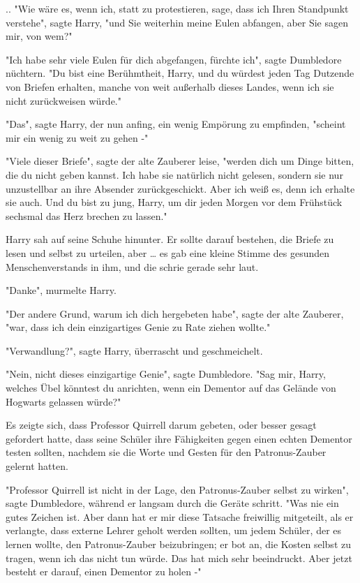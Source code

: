 {.. "Wie wäre es, wenn ich, statt zu protestieren, sage, dass ich Ihren Standpunkt verstehe", sagte Harry, "und Sie weiterhin meine Eulen abfangen, aber Sie sagen mir, von wem?"

"Ich habe sehr viele Eulen für dich abgefangen, fürchte ich", sagte Dumbledore nüchtern. "Du bist eine Berühmtheit, Harry, und du würdest jeden Tag Dutzende von Briefen erhalten, manche von weit außerhalb dieses Landes, wenn ich sie nicht zurückweisen würde."

"Das", sagte Harry, der nun anfing, ein wenig Empörung zu empfinden, "scheint mir ein wenig zu weit zu gehen -"

"Viele dieser Briefe", sagte der alte Zauberer leise, "werden dich um Dinge bitten, die du nicht geben kannst. Ich habe sie natürlich nicht gelesen, sondern sie nur unzustellbar an ihre Absender zurückgeschickt. Aber ich weiß es, denn ich erhalte sie auch. Und du bist zu jung, Harry, um dir jeden Morgen vor dem Frühstück sechsmal das Herz brechen zu lassen."

Harry sah auf seine Schuhe hinunter. Er sollte darauf bestehen, die Briefe zu lesen und selbst zu urteilen, aber … es gab eine kleine Stimme des gesunden Menschenverstands in ihm, und die schrie gerade sehr laut.

"Danke", murmelte Harry.

"Der andere Grund, warum ich dich hergebeten habe", sagte der alte Zauberer, "war, dass ich dein einzigartiges Genie zu Rate ziehen wollte."

"Verwandlung?", sagte Harry, überrascht und geschmeichelt.

"Nein, nicht dieses einzigartige Genie", sagte Dumbledore. "Sag mir, Harry, welches Übel könntest du anrichten, wenn ein Dementor auf das Gelände von Hogwarts gelassen würde?"

Es zeigte sich, dass Professor Quirrell darum gebeten, oder besser gesagt gefordert hatte, dass seine Schüler ihre Fähigkeiten gegen einen echten Dementor testen sollten, nachdem sie die Worte und Gesten für den Patronus-Zauber gelernt hatten.

"Professor Quirrell ist nicht in der Lage, den Patronus-Zauber selbst zu wirken", sagte Dumbledore, während er langsam durch die Geräte schritt. "Was nie ein gutes Zeichen ist. Aber dann hat er mir diese Tatsache freiwillig mitgeteilt, als er verlangte, dass externe Lehrer geholt werden sollten, um jedem Schüler, der es lernen wollte, den Patronus-Zauber beizubringen; er bot an, die Kosten selbst zu tragen, wenn ich das nicht tun würde. Das hat mich sehr beeindruckt. Aber jetzt besteht er darauf, einen Dementor zu holen -"

}
